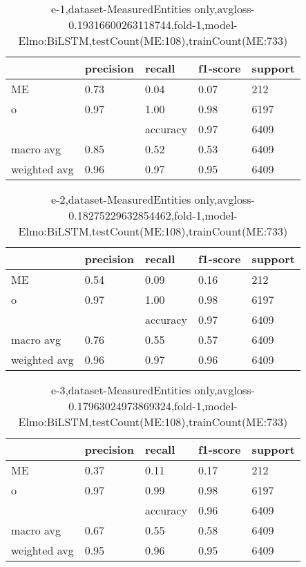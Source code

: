 \begin{table}[!ht] 
\centering
\caption{e-1,dataset-MeasuredEntities only,avgloss-0.19316600263118744,fold-1,model-Elmo:BiLSTM,testCount(ME:108),trainCount(ME:733)}\label{e-1data-meS.tsv}
\begin{tabularx}{300pt}{|X|X|X|X|X|}
\hline
&precision&recall&f1-score&support\\
\hline
ME&0.73&0.04&0.07&212\\
\hline
o&0.97&1.00&0.98&6197\\
\hline
&&accuracy&0.97&6409\\
\hline
macro avg&0.85&0.52&0.53&6409\\
\hline
weighted avg&0.96&0.97&0.95&6409\\
\hline
\end{tabularx}
\end{table}
\begin{table}[!ht] 
\centering
\caption{e-2,dataset-MeasuredEntities only,avgloss-0.18275229632854462,fold-1,model-Elmo:BiLSTM,testCount(ME:108),trainCount(ME:733)}\label{e-2data-meS.tsv}
\begin{tabularx}{300pt}{|X|X|X|X|X|}
\hline
&precision&recall&f1-score&support\\
\hline
ME&0.54&0.09&0.16&212\\
\hline
o&0.97&1.00&0.98&6197\\
\hline
&&accuracy&0.97&6409\\
\hline
macro avg&0.76&0.55&0.57&6409\\
\hline
weighted avg&0.96&0.97&0.96&6409\\
\hline
\end{tabularx}
\end{table}
\begin{table}[!ht] 
\centering
\caption{e-3,dataset-MeasuredEntities only,avgloss-0.17963024973869324,fold-1,model-Elmo:BiLSTM,testCount(ME:108),trainCount(ME:733)}\label{e-3data-meS.tsv}
\begin{tabularx}{300pt}{|X|X|X|X|X|}
\hline
&precision&recall&f1-score&support\\
\hline
ME&0.37&0.11&0.17&212\\
\hline
o&0.97&0.99&0.98&6197\\
\hline
&&accuracy&0.96&6409\\
\hline
macro avg&0.67&0.55&0.58&6409\\
\hline
weighted avg&0.95&0.96&0.95&6409\\
\hline
\end{tabularx}
\end{table}
